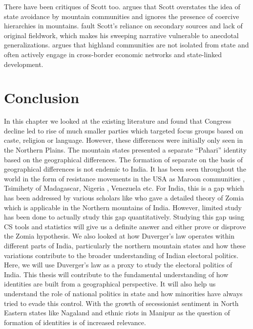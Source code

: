 \begin{sloppypar}
There have been critiques of Scott too.  \cite{lieberman2010zone} argues that Scott overstates the idea of state avoidance by mountain communities and ignores the presence of coercive hierarchies in mountains.  \cite{michaud2010editorial} fault Scott's reliance on secondary sources and lack of original fieldwork, which makes his sweeping narrative vulnerable to anecdotal generalizations. \cite{sturgeon2013cross} argues that highland communities are not isolated from state and often actively engage in cross-border economic networks and state-linked development.

 \section{Conclusion}

 In this chapter we looked at the existing literature and found that Congress decline led to rise of much smaller parties which targeted focus groups based on caste, religion or language. However, these differences were initially only seen in the Northern Plains. The mountain states presented a separate ``Pahari'' identity based on the geographical differences. The formation of separate on the basis of geographical differences is not endemic to India. It has been seen throughout the world in the form of resistance movements in the USA as Maroon communities \citep{price2020rainforest}, Tsimihety of Madagascar, Nigeria , Venezuela etc. For India, this is a gap which has been addressed by various scholars like \cite{scott2005civilizations} who gave a detailed theory of Zomia which is applicable in the Northern mountains of India. However, limited study has been done to actually study this gap quantitatively. Studying this gap using CS tools and statistics will give us a definite answer and either prove or disprove the Zomia hypothesis. We also looked at how Duverger's law operates within different parts of India, particularly the northern mountain states and how these variations contribute to the broader understanding of Indian electoral politics. Here, we will use Duverger's law as a proxy to study the electoral politics of India. This thesis will contribute to the fundamental understanding of how identities are built from a geographical perspective. It will also help us understand the role of national politics in state and how minorities have always tried to evade this control. With the growth of secessionist sentiment in North Eastern states like Nagaland and ethnic riots in Manipur as the question of formation of identities is of increased relevance.

\end{sloppypar}